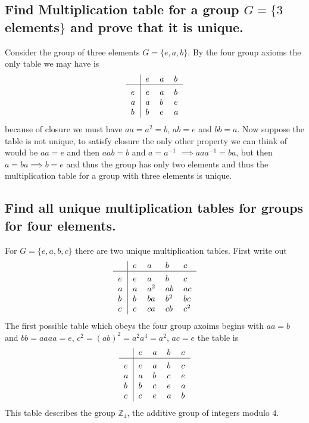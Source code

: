 \documentclass[main.tex]{subfiles}
\begin{document}
\subsection{Find Multiplication table for a group $G=\{3$ elements$\}$ and prove that it is unique.}
Consider the group of three elements $G=\{e,a,b\}$. By the four group axioms the only table we may have is
\[
    \begin{tabular}{>{$}l<{$}|*{3}{>{$}l<{$}}}
    ~   & e   & a   & b   \\
    \hline\vrule height 12pt width 0pt
    e   & e   & a   & b  \\
    a   & a   & b & e     \\
    b & b & e   & a     \\

    \end{tabular} 
\]
because of closure we must have $aa=a^2=b$, $ab=e$ and $bb=a$. Now suppose the table is not unique, to satisfy closure the only other property we can think of would be $aa=e$ and then $aab=b$ and $a=a^{-1}$ $\implies aaa^{-1}=ba$, but then $a=ba\implies b=e$ and thus the group has only two elements and thus the multiplication table for a group with three elements is unique.
\subsection{Find all unique multiplication tables for groups for four elements.}
For $G=\{e,a,b,c\}$ there are two unique multiplication tables. First write out
\[
    \begin{tabular}{>{$}l<{$}|*{4}{>{$}l<{$}}}
    ~   & e   & a   & b & c    \\
    \hline\vrule height 12pt width 0pt
    e   & e   & a   & b   & c  \\
    a   & a   & a^2 & ab  & ac  \\
    b   & b   & ba  & b^2 & bc  \\
    c   & c   & ca  & cb  & c^2  \\
    \end{tabular} 
\]
The first possible table which obeys the four group axoims begins with $aa=b$ and $bb=aaaa=e$, $c^2=(ab)^2=a^2a^4=a^2$, $ac=e$ the table is
\[
    \begin{tabular}{>{$}l<{$}|*{4}{>{$}l<{$}}}
    ~   & e   & a   & b & c    \\
    \hline\vrule height 12pt width 0pt
    e   & e   & a  & b  & c  \\
    a   & a   & b  & c  & e  \\
    b   & b   & c  & e  & a  \\
    c   & c   & e  & a  & b  \\
    \end{tabular} 
\]
This table describes the group $\mathbb{Z}_4$, the additive group of integers modulo $4$.
\end{document}
